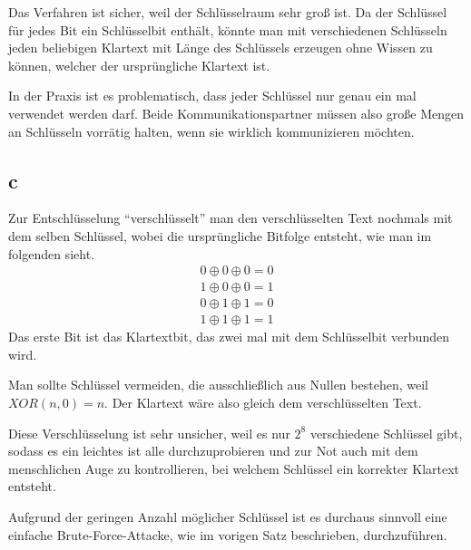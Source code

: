 \documentclass[a4paper,10pt]{article}
\begin{document}
Das Verfahren ist sicher, weil der Schlüsselraum sehr groß ist.
Da der Schlüssel für jedes Bit ein Schlüsselbit enthält, könnte man mit verschiedenen Schlüsseln jeden beliebigen Klartext mit Länge des Schlüssels erzeugen ohne Wissen zu können, welcher der ursprüngliche Klartext ist.

In der Praxis ist es problematisch, dass jeder Schlüssel nur genau ein mal verwendet werden darf.
Beide Kommunikationspartner müssen also große Mengen an Schlüsseln vorrätig halten, wenn sie wirklich kommunizieren möchten.

\subsection*{c}

Zur Entschlüsselung ``verschlüsselt'' man den verschlüsselten Text nochmals mit dem selben Schlüssel, wobei die ursprüngliche Bitfolge entsteht, wie man im folgenden sieht.
\begin{align*}
 0 \oplus 0 \oplus 0 = 0\\
 1 \oplus 0 \oplus 0 = 1\\
 0 \oplus 1 \oplus 1 = 0\\
 1 \oplus 1 \oplus 1 = 1
\end{align*}
Das erste Bit ist das Klartextbit, das zwei mal mit dem Schlüsselbit verbunden wird.

Man sollte Schlüssel vermeiden, die ausschließlich aus Nullen bestehen, weil $XOR(n, 0) = n$.
Der Klartext wäre also gleich dem verschlüsselten Text.

Diese Verschlüsselung ist sehr unsicher, weil es nur $2^8$ verschiedene Schlüssel gibt, sodass es ein leichtes ist alle durchzuprobieren und zur Not auch mit dem menschlichen Auge zu kontrollieren, bei welchem Schlüssel ein korrekter Klartext entsteht.

Aufgrund der geringen Anzahl möglicher Schlüssel ist es durchaus sinnvoll eine einfache Brute-Force-Attacke, wie im vorigen Satz beschrieben, durchzuführen.
\end{document}
